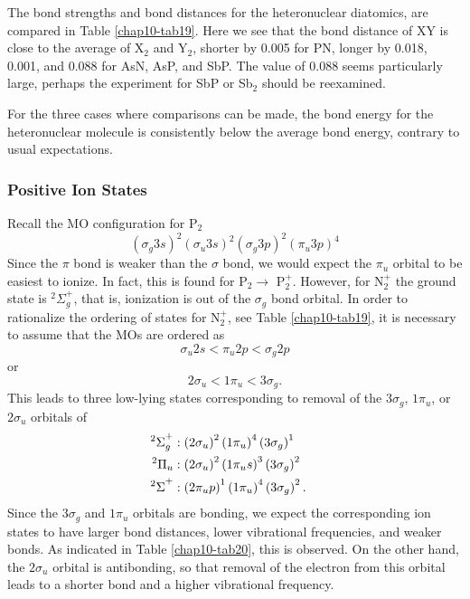 The bond strengths and bond distances for the heteronuclear diatomics,
are compared in Table \ref{chap10-tab19}.  Here we see that the bond
distance of XY is close to the average of X$_2$ and Y$_2$, shorter by
0.005 for PN, longer by 0.018, 0.001, and 0.088 for AsN, AsP, and SbP.
The value of 0.088 seems particularly large, perhaps the experiment
for SbP or Sb$_2$ should be reexamined.
	
For the three cases where comparisons can be made, the bond 
energy for the heteronuclear molecule is consistently below 
the average bond energy, contrary to usual expectations.

\subsubsection{Positive Ion States}

Recall the MO configuration for P$_2$
\begin{equation}
\left( \sigma_g 3s \right)^2 \left( \sigma_u 3s 
\right)^2 \left( \sigma_g 3p \right)^2 \left( \pi_u 3p \right)^4
\end{equation}
Since the $\pi$ bond is weaker than the $\sigma$ bond, we would expect
the $\pi_u$ orbital to be easiest to ionize. In fact, this is found
for P$_2 \rightarrow$ P$_2^+$.  However, for N$^+_2$ the ground state
is ${^2\Sigma}^+_g$, that is, ionization is out of the $\sigma_g$ bond
orbital. In order to rationalize the ordering of states for N$^+_2$,
see Table \ref{chap10-tab19}, it is necessary to assume that the
MOs are ordered as
\begin{equation}
\sigma_u 2s < \pi_u 2p < \sigma_g 2p
\end{equation}
or
\begin{equation}
2 \sigma_u < 1 \pi_u < 3 \sigma_g .
\end{equation}
This leads to three low-lying states corresponding to removal 
of the $3\sigma_g$, $1 \pi_u$, or $2 \sigma_u$ orbitals of
\begin{eqnarray}
{^2\Sigma}^+_g &: \left( 2 \sigma_u \right)^2 \left( 1 \pi_u 
\right)^4 \left( 3 \sigma_g \right)^1\cr
{^2\Pi}_u &: \left( 2 \sigma_u \right)^2 \left( 1 \pi_u  s
\right)^3 \left( 3 \sigma_g \right)^2\cr
{^2\Sigma}^+ &: \left( 2 \pi_u p \right)^1 \left( 1 \pi_u 
\right)^4 \left( 3 \sigma_g \right)^2 .
\end{eqnarray}
Since the $3\sigma_g$ and $1 \pi_u$ orbitals are bonding, we expect
the corresponding ion states to have larger bond distances, lower
vibrational frequencies, and weaker bonds. As indicated in Table
\ref{chap10-tab20}, this is observed.  On the other hand, the $2
\sigma_u$ orbital is antibonding, so that removal of the electron from
this orbital leads to a shorter bond and a higher vibrational
frequency.

